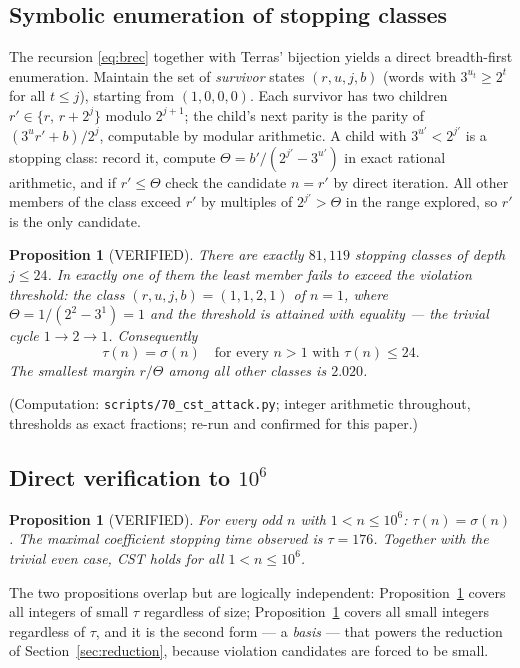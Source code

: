 \documentclass[10pt]{article}
\newtheorem{proposition}[theorem]{Proposition}
\theoremstyle{definition}
\theoremstyle{remark}
\begin{document}
\subsection{Symbolic enumeration of stopping classes}

The recursion \eqref{eq:brec} together with Terras' bijection yields a direct
breadth-first enumeration. Maintain the set of \emph{survivor} states
$(r, u, j, b)$ (words with $3^{u_t} \ge 2^{t}$ for all $t \le j$), starting
from $(1, 0, 0, 0)$. Each survivor has two children $r' \in
\{r,\, r + 2^{j}\}$ modulo $2^{j+1}$; the child's next parity is the parity of
$(3^{u} r' + b)/2^{j}$, computable by modular arithmetic. A child with
$3^{u'} < 2^{j'}$ is a stopping class: record it, compute
$\Theta = b'/(2^{j'} - 3^{u'})$ in exact rational arithmetic, and if
$r' \le \Theta$ check the candidate $n = r'$ by direct iteration. All other
members of the class exceed $r'$ by multiples of $2^{j'} > \Theta$ in the
range explored, so $r'$ is the only candidate.

\begin{proposition}[VERIFIED]\label{prop:enum}
There are exactly $81{,}119$ stopping classes of depth $j \le 24$. In exactly
one of them the least member fails to exceed the violation threshold: the
class $(r,u,j,b) = (1, 1, 2, 1)$ of $n = 1$, where
$\Theta = 1/(2^{2}-3^{1}) = 1$ and the threshold is attained with
\emph{equality} --- the trivial cycle $1 \to 2 \to 1$. Consequently
\[
\tau(n) = \sigma(n) \quad \text{for every } n > 1 \text{ with } \tau(n)\le 24.
\]
The smallest margin $r/\Theta$ among all other classes is $2.020$.
\end{proposition}

(Computation: \texttt{scripts/70\_cst\_attack.py}; integer arithmetic
throughout, thresholds as exact fractions; re-run and confirmed for this
paper.)

\subsection{Direct verification to $10^{6}$}

\begin{proposition}[VERIFIED]\label{prop:direct}
For every odd $n$ with $1 < n \le 10^{6}$: $\tau(n) = \sigma(n)$. The maximal
coefficient stopping time observed is $\tau = 176$. Together with the trivial
even case, CST holds for all $1 < n \le 10^{6}$.
\end{proposition}

The two propositions overlap but are logically independent:
Proposition~\ref{prop:enum} covers all integers of small $\tau$ regardless of
size; Proposition~\ref{prop:direct} covers all small integers regardless of
$\tau$, and it is the second form --- a \emph{basis} --- that powers the
reduction of Section~\ref{sec:reduction}, because violation candidates are
forced to be small.
\end{document}
